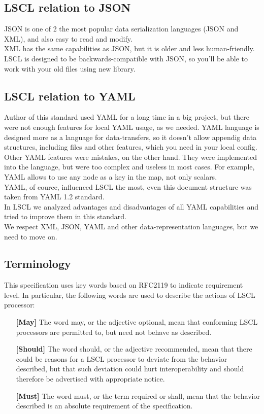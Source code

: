 \subsection{LSCL relation to JSON}
JSON is one of 2 the most popular data serialization languages (JSON and XML), and also easy to read and modify. \\
XML has the same capabilities as JSON, but it is older and less human-friendly. \\
LSCL is designed to be backwards-compatible with JSON, so you'll be able to work with your old files using new library.

\subsection{LSCL relation to YAML}
Author of this standard used YAML for a long time in a big project, but there were not enough features for local YAML usage, as we needed. YAML language is designed more as a language for data-transfers, so it doesn't allow appendig data structures, including files and other features, which you need in your local config. \\
Other YAML features were mistakes, on the other hand. They were implemented into the language, but were too complex and useless in most cases. For example, YAML allows to use any node as a key in the map, not only scalars. \\
YAML, of cource, influenced LSCL the most, even this document structure was taken from YAML 1.2 standard. \\
In LSCL we analyzed advantages and disadvantages of all YAML capabilities and tried to improve them in this standard. \\
We respect XML, JSON, YAML and other data-representation languages, but we need to move on.

\subsection{Terminology}
This specification uses key words based on RFC2119 to indicate requirement level. In particular, the following words are used to describe the actions of LSCL processor:\\
\begin{itemize}
	\item [\textbf{[May]}] The word may, or the adjective optional, mean that conforming LSCL processors are permitted to, but need not behave as described. \\
	\item [\textbf{[Should]}] The word should, or the adjective recommended, mean that there could be reasons for a LSCL processor to deviate from the behavior described, but that such deviation could hurt interoperability and should therefore be advertised with appropriate notice. \\
	\item [\textbf{[Must]}] The word must, or the term required or shall, mean that the behavior described is an absolute requirement of the specification.
\end{itemize}

